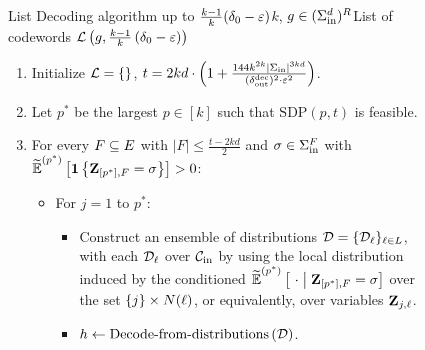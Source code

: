 \begin{figure}[!ht]
\begin{algorithm}{List Decoding algorithm up to $\frac{k-1}{k}(\delta_0-\varepsilon)$}{$k$, $g \in (\Sigma_{\mathrm{in}}^d)^R$}{List of codewords ${\mathcal L}\left(g, \frac{k-1}{k}\left(\delta_0-\varepsilon\right)\right)$}\label{algo:sos-decoding}
%
\begin{enumerate}
%
	\item Initialize ${\mathcal L} = \{ \}$, $t = 2kd\cdot \left(1+\frac{144k^{2k}|\Sigma_{\mathrm{in}}|^{3kd}}{(\delta_{\mathrm{out}}^{\mathrm{dec}})^2\cdot \varepsilon^2}\right)$.
	\item Let $p^*$ be the largest $p\in [k]$ such that $\mathrm{SDP}(p,t)$ is feasible.
	\item For every $F \subseteq E$ with $|F|\leq \frac{t-2kd}{2}$ and $\sigma\in \Sigma_{\mathrm{in}}^F$ with $\widetilde{\operatorname*{\mathbb{E}}}^{(p^*)}\left[ {{\mathbf{1}} \left\{ { \mathbf{Z} }_{[p^*],F} = \sigma \right\} } \right] > 0$:\label{step3}
		\begin{itemize}
		\item For $j=1$ to $p^*$:
		\begin{itemize}
			\item Construct an ensemble of distributions ${\mathcal D} = \{{\mathcal D}_{{ \ell }}\}_{{ \ell }\in L}$, with each ${\mathcal D}_{{ \ell }}$ over ${\mathcal C}_{\mathrm{in}}$ by using the local distribution induced by the conditioned $\pcod{p^*}{ ~\cdot \given \zee_{[p^*],F} = \sigma}$ over the set $\{j\} \times N({ \ell })$, or equivalently, over variables ${ \mathbf{Z} }_{j,{ \ell }}$.
			\item $h\leftarrow \text{Decode-from-distributions} \left({\mathcal D}\right)$.

\end{itemize}
\end{itemize}
\end{enumerate}
\end{algorithm}
\end{figure}
